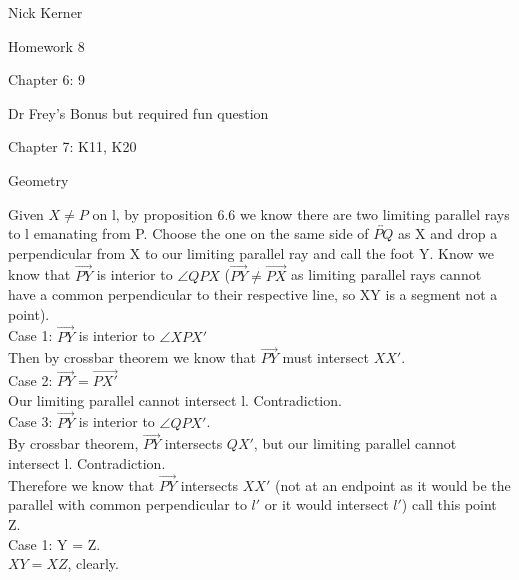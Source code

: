 \documentclass[12pt,letterpaper]{article}
\newcommand{\pro}[1]{\noindent {\bf #1}}
\begin{document}
\begin{flushright}
Nick Kerner

Homework 8

Chapter 6: 9

Dr Frey's Bonus but required fun question

Chapter 7: K11, K20

\end{flushright}
\begin{center}
\large{Geometry}\\
\end{center}

\pro{Chapter 6: problem 9 }

Given $X\neq P $ on l, by proposition 6.6 we know there are two limiting parallel rays to l emanating from P.  Choose the one on the same side of $\overleftrightarrow{PQ}$ as X and drop a perpendicular from X to our limiting parallel ray and call the foot Y.   Know we know that $\overrightarrow{PY}$ is interior to $\angle QPX$ ($\overrightarrow{PY}\neq \overrightarrow{PX}$ as limiting parallel rays cannot have a common perpendicular to their respective line, so XY is a segment not a point). \\

Case 1: $\overrightarrow{PY}$ is interior to $\angle XPX'$\\

Then by crossbar theorem we know that $\overrightarrow{PY}$ must intersect $XX'$. \\

Case 2: $\overrightarrow{PY} = \overrightarrow{PX'}$\\

Our limiting parallel cannot intersect l.  Contradiction.\\

Case 3: $\overrightarrow{PY}$ is interior to $\angle QPX'$.\\

By crossbar theorem, $\overrightarrow{PY}$ intersects $QX'$, but our limiting parallel cannot intersect l.  Contradiction.\\

Therefore we know that $\overrightarrow{PY}$ intersects $XX'$ (not at an endpoint as it would be the parallel with common perpendicular to $l'$ or it would intersect $l'$) call this point Z.  \\

Case 1: Y = Z.\\

$XY = XZ$, clearly. \\
\end{document}
